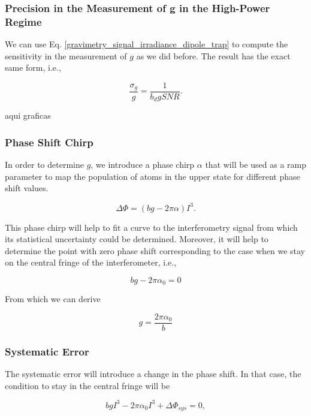 \documentclass{article}
\begin{document}
\subsubsection{Precision in the Measurement of g in the High-Power Regime}
We can use Eq. \ref{gravimetry_signal_irradiance_dipole_trap} to compute the sensitivity in the measurement of $g$ as we did before. The result has the exact same form, i.e.,

\begin{equation}\label{sensitivity_eq_dipole}
    \frac{\sigma_{g}}{g} = \frac{1}{b_{d} g SNR}.
\end{equation}

aqui graficas

\subsubsection{Phase Shift Chirp}
In order to determine $g$, we introduce a phase chirp $\alpha$ that will be used as a ramp parameter to map the population of atoms in the upper state for different phase shift values. 

\begin{equation}
    \Delta \Phi = (b g  - 2\pi \alpha) I^3.
\end{equation}

This phase chirp will help to fit a curve to the interferometry signal from which its statistical uncertainty could be determined. Moreover, it will help to determine the point with zero phase shift corresponding to the case when we stay on the central fringe of the interferometer, i.e.,

\begin{equation}
    b g  - 2\pi \alpha_{0} = 0
\end{equation}

From which we can derive

\begin{equation}
    g = \frac{2\pi \alpha_{0}}{b}
\end{equation}

\subsubsection{Systematic Error}
The systematic error will introduce a change in the phase shift. In that case, the condition to stay in the central fringe will be

\begin{equation}
    b g I^3 - 2\pi \alpha_{0} I^3 + \Delta \Phi_{sys}= 0,
\end{equation}
\end{document}
